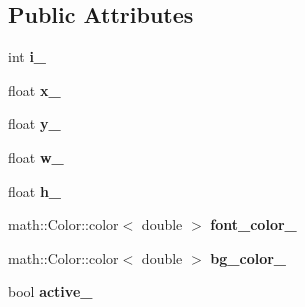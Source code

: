 \subsection*{\-Public \-Attributes}
\begin{DoxyCompactItemize}
\item 
\hypertarget{classglutpp_1_1gui_1_1object_1_1object_a872bc716a3da0e21826a55ecda93ea09}{int {\bfseries i\-\_\-}}\label{classglutpp_1_1gui_1_1object_1_1object_a872bc716a3da0e21826a55ecda93ea09}

\item 
\hypertarget{classglutpp_1_1gui_1_1object_1_1object_af43dabeecf209f6f76f63084a9c46278}{float {\bfseries x\-\_\-}}\label{classglutpp_1_1gui_1_1object_1_1object_af43dabeecf209f6f76f63084a9c46278}

\item 
\hypertarget{classglutpp_1_1gui_1_1object_1_1object_ac367ab365ffcec89c7b2967b36080afc}{float {\bfseries y\-\_\-}}\label{classglutpp_1_1gui_1_1object_1_1object_ac367ab365ffcec89c7b2967b36080afc}

\item 
\hypertarget{classglutpp_1_1gui_1_1object_1_1object_ad9d186399e3f87838181cd0c102bef7e}{float {\bfseries w\-\_\-}}\label{classglutpp_1_1gui_1_1object_1_1object_ad9d186399e3f87838181cd0c102bef7e}

\item 
\hypertarget{classglutpp_1_1gui_1_1object_1_1object_aaa568a2621eb9e20129d1166f78d9b76}{float {\bfseries h\-\_\-}}\label{classglutpp_1_1gui_1_1object_1_1object_aaa568a2621eb9e20129d1166f78d9b76}

\item 
\hypertarget{classglutpp_1_1gui_1_1object_1_1object_aa5ac65cfad80700543eef857810260a4}{math\-::\-Color\-::color$<$ double $>$ {\bfseries font\-\_\-color\-\_\-}}\label{classglutpp_1_1gui_1_1object_1_1object_aa5ac65cfad80700543eef857810260a4}

\item 
\hypertarget{classglutpp_1_1gui_1_1object_1_1object_a81ffe55b2f835a6031ff4f66f9a6006f}{math\-::\-Color\-::color$<$ double $>$ {\bfseries bg\-\_\-color\-\_\-}}\label{classglutpp_1_1gui_1_1object_1_1object_a81ffe55b2f835a6031ff4f66f9a6006f}

\item 
\hypertarget{classglutpp_1_1gui_1_1object_1_1object_ae49a9bf7272bc699054def137a41fcd6}{bool {\bfseries active\-\_\-}}\label{classglutpp_1_1gui_1_1object_1_1object_ae49a9bf7272bc699054def137a41fcd6}


\end{DoxyCompactItemize}
